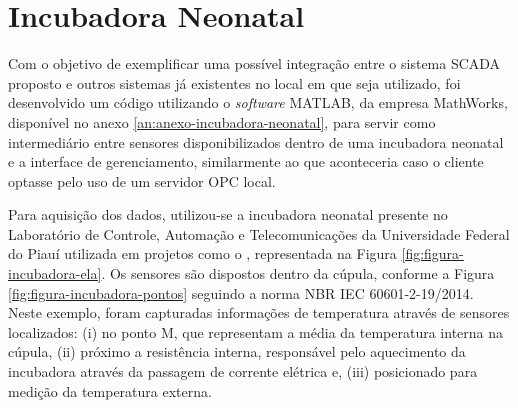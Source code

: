 \section{Incubadora Neonatal}
\label{sec:incubadora-neonatal}
Com o objetivo de exemplificar uma possível integração entre o sistema \gls{SCADA} proposto e outros sistemas já existentes no local em que seja utilizado, foi desenvolvido um código utilizando o \textit{software} MATLAB, da empresa MathWorks, disponível no anexo \ref{an:anexo-incubadora-neonatal}, para servir como intermediário entre sensores disponibilizados dentro de uma incubadora neonatal e a interface de gerenciamento, similarmente ao que aconteceria caso o cliente optasse pelo uso de um servidor \gls{OPC} local. 
        \begin{figure}[!h]
    	\end{figure}
    	
Para aquisição dos dados, utilizou-se a incubadora neonatal presente no Laboratório de Controle, Automação e Telecomunicações da Universidade Federal do Piauí utilizada em projetos como o , representada na Figura \ref{fig:figura-incubadora-ela}. Os sensores são dispostos dentro da cúpula, conforme a Figura \ref{fig:figura-incubadora-pontos} seguindo a norma NBR IEC 60601-2-19/2014. Neste exemplo, foram capturadas informações de temperatura através de sensores localizados: (i) no ponto M, que representam a média da temperatura interna na cúpula, (ii) próximo a resistência interna, responsável pelo aquecimento da incubadora através da passagem de corrente elétrica  e, (iii) posicionado para medição da temperatura externa.
    	

